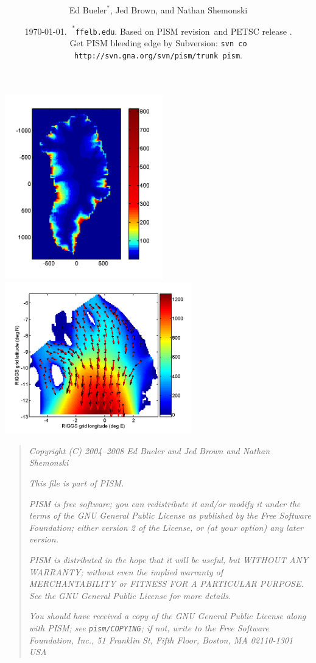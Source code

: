 \documentclass[11pt,final]{amsart}
\title[PISM User's Manual]{\protect{\Large PISM, a \underline{P}arallel \underline{I}ce \underline{S}heet \underline{M}odel:\normalsize} \\ \protect{\Large \bigskip \bigskip User's Manual\normalsize}}
\author[]{Ed $\text{Bueler}^\ast$, Jed Brown, and Nathan Shemonski}
\date{\today.  $\phantom{|}^\ast$\texttt{ffelb\@@uaf.edu}.  Based on PISM revision \PISMREV\,and PETSC release \PETSCREV.  \\\tiny Get PISM bleeding edge by Subversion: \texttt{svn co http://svn.gna.org/svn/pism/trunk pism}.}
\newcommand{\normalspacing}{\renewcommand{\baselinestretch}{1.1}\tiny\normalsize}
\newcommand{\tablespacing}{\renewcommand{\baselinestretch}{1.0}\tiny\normalsize}
\begin{document}
\maketitle
\thispagestyle{empty}

\vspace{2.0in}
\begin{center}
\includegraphics[width=2.7in,keepaspectratio=true]{figs/greencbar_SSL2}\quad \includegraphics[width=3.2in,keepaspectratio=true]{figs/rossquiver}
\end{center}

\newpage
\phantom{bob}
\vspace{2in}
\begin{quote}
\textsl{Copyright (C) 2004--2008 Ed Bueler and Jed Brown and Nathan Shemonski}
\medskip

\noindent \textsl{This file is part of PISM.}
\medskip

\noindent \textsl{PISM is free software; you can redistribute it and/or modify it under the terms of the GNU General Public License as published by the Free Software Foundation; either version 2 of the License, or (at your option) any later version.}
\medskip

\noindent \textsl{PISM is distributed in the hope that it will be useful, but WITHOUT ANY WARRANTY; without even the implied warranty of MERCHANTABILITY or FITNESS FOR A PARTICULAR PURPOSE.  See the GNU General Public License for more details.}
\medskip

\noindent \textsl{You should have received a copy of the GNU General Public License along with PISM; see \emph{\texttt{pism/COPYING}}; if not, write to the Free Software Foundation, Inc., 51 Franklin St, Fifth Floor, Boston, MA  02110-1301 USA}
\end{quote}
\vspace{1in}
\normalspacing
\end{document}
